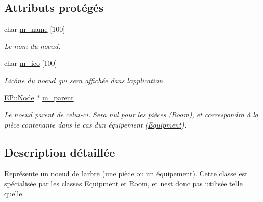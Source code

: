 \subsection*{Attributs protégés}
\begin{DoxyCompactItemize}
\item 
char \hyperlink{class_e_p_1_1_node_a31312ed65b64cb081b4cbdf0acffa44f}{m\+\_\+name} \mbox{[}100\mbox{]}\hypertarget{class_e_p_1_1_node_a31312ed65b64cb081b4cbdf0acffa44f}{}\label{class_e_p_1_1_node_a31312ed65b64cb081b4cbdf0acffa44f}

\begin{DoxyCompactList}\small\item\em Le nom du noeud. \end{DoxyCompactList}\item 
char \hyperlink{class_e_p_1_1_node_a149cce768568286687e756c1f9dce2b4}{m\+\_\+ico} \mbox{[}100\mbox{]}\hypertarget{class_e_p_1_1_node_a149cce768568286687e756c1f9dce2b4}{}\label{class_e_p_1_1_node_a149cce768568286687e756c1f9dce2b4}

\begin{DoxyCompactList}\small\item\em L\textquotesingle{}icône du noeud qui sera affichée dans l\textquotesingle{}application. \end{DoxyCompactList}\item 
\hyperlink{class_e_p_1_1_node}{E\+P\+::\+Node} $\ast$ \hyperlink{class_e_p_1_1_node_ac61ce03b473134cb3cd4fcf33acc03f6}{m\+\_\+parent}\hypertarget{class_e_p_1_1_node_ac61ce03b473134cb3cd4fcf33acc03f6}{}\label{class_e_p_1_1_node_ac61ce03b473134cb3cd4fcf33acc03f6}

\begin{DoxyCompactList}\small\item\em Le noeud parent de celui-\/ci. Sera nul pour les pièces (\hyperlink{class_e_p_1_1_room}{Room}), et correspondra à la pièce contenante dans le cas d\textquotesingle{}un équipement (\hyperlink{class_e_p_1_1_equipment}{Equipment}). \end{DoxyCompactList}\end{DoxyCompactItemize}


\subsection{Description détaillée}
Représente un noeud de l\textquotesingle{}arbre (une pièce ou un équipement). Cette classe est spécialisée par les classes \hyperlink{class_e_p_1_1_equipment}{Equipment} et \hyperlink{class_e_p_1_1_room}{Room}, et n\textquotesingle{}est donc pas utilisée telle qu\textquotesingle{}elle. 

